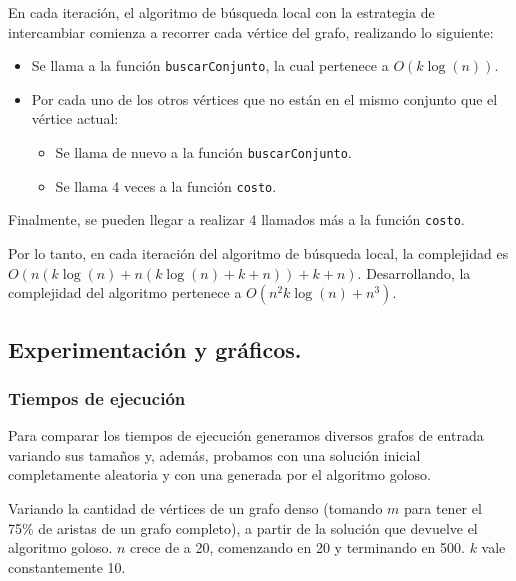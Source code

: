 En cada iteración, el algoritmo de búsqueda local con la estrategia de
intercambiar comienza a recorrer cada vértice del grafo, realizando lo siguiente:

\begin{itemize}
  \item Se llama a la función \texttt{buscarConjunto}, la cual pertenece a
  $O(k\log(n))$.

  \item Por cada uno de los otros vértices que no están en el mismo conjunto
  que el vértice actual:

  \begin{itemize}
    \item Se llama de nuevo a la función \texttt{buscarConjunto}.

    \item Se llama 4 veces a la función \texttt{costo}.
  \end{itemize}
\end{itemize}

Finalmente, se pueden llegar a realizar 4 llamados más a la función
\texttt{costo}.

Por lo tanto, en cada iteración del algoritmo de búsqueda local, la complejidad
es $O(n (k\log(n) + n (k\log(n) + k + n)) + k + n)$. Desarrollando, la
complejidad del algoritmo pertenece a $O(n^2k\log(n) + n^3)$.


\newpage \subsection{Experimentación y gráficos.}

\subsubsection{Tiempos de ejecución}

Para comparar los tiempos de ejecución generamos diversos grafos de entrada
variando sus tamaños y, además, probamos con una solución inicial completamente
aleatoria y con una generada por el algoritmo goloso.
\vspace*{0.5cm}

Variando la cantidad de vértices de un grafo denso (tomando $m$ para tener el
75\% de aristas de un grafo completo), a partir de la solución que devuelve el
algoritmo goloso. $n$ crece de a 20, comenzando en 20 y terminando en 500.  $k$
vale constantemente 10.

